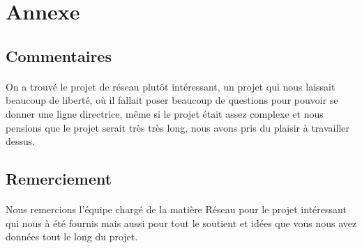 \documentclass[a4paper,titlepage]{report}
\begin{document}
\section{Annexe}
\subsection{Commentaires}
\paragraph{}
On a trouvé le projet de réseau plutôt intéressant, un projet qui nous laissait beaucoup de liberté, où il fallait poser beaucoup de questions pour pouvoir se donner une ligne directrice, même si le projet était assez complexe et nous pensions que le projet serait très très long, nous avons pris du plaisir à travailler dessus.
\subsection{Remerciement}
\paragraph{}
Nous remercions l'équipe chargé de la matière Réseau pour le projet intéressant qui nous à été fournis mais aussi pour tout le soutient et idées que vous nous avez données tout le long du projet.
\end{document}
